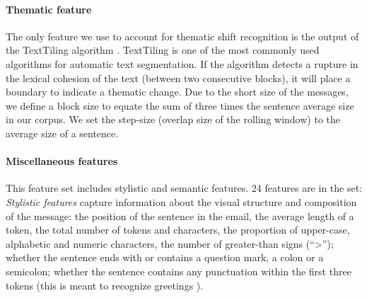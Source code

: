 
\paragraph{Thematic feature}
%
The only feature we use to account for thematic shift recognition is the output of the TextTiling algorithm \cite{hearst1997texttiling}. TextTiling is one of the most commonly used algorithms for automatic text segmentation. 
If the algorithm detects a rupture in the lexical cohesion %
of the text (between two consecutive blocks), it will place a boundary to indicate a thematic change. %
%
Due to the short size of the messages, we define a block size to equate the sum of three times the sentence average size in our corpus. We set the step-size (overlap size of the rolling window) to the average size of a sentence.

\paragraph{Miscellaneous features}
%
This feature set includes stylistic %
and semantic features. 24 features are in the set:
%
\textit{Stylistic features} capture information about the visual structure and composition of the message:
the position of the sentence in the email, 
the average length of a token,
the total number of tokens and characters, 
the proportion of upper-case, alphabetic and numeric characters,
the number of greater-than signs (``>''); %
whether the sentence ends with or contains a question mark, a colon or a semicolon; %
whether the sentence contains any punctuation within the first three tokens (this is meant to recognize greetings \cite{qadir2011classifying}).

